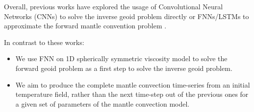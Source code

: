 Overall, previous works have explored the usage of Convolutional Neural Networks (CNNs) to solve the inverse geoid problem directly \citep{kerl2022geoid} or FNNs/LSTMs to approximate the forward mantle convention problem \citep{10.1103_physrevfluids.6.113801}. 

In contrast to these works:
\begin{itemize}
    \item We use FNN on 1D spherically symmetric viscosity model to solve the forward geoid problem as a first step to solve the inverse geoid problem.
    
    \item We aim to produce the complete mantle convection time-series from an initial temperature field, rather than the next time-step out of the previous ones for a given set of parameters of the mantle convection model.
\end{itemize}
